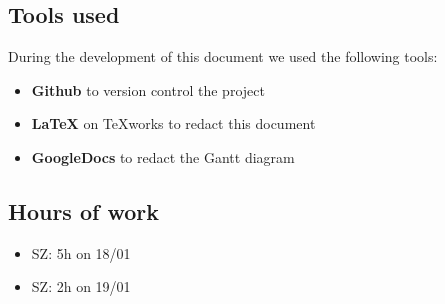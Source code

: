 \documentclass[11pt]{article} %
\begin{document}
\subsection{Tools used}
During the development of this document we used the following tools:
\begin{itemize}
	\item \textbf{Github} to version control the project
	\item \textbf{\LaTeX} on TeXworks to redact this document
	\item \textbf{GoogleDocs} to redact the Gantt diagram
\end{itemize}

\subsection{Hours of work}
\begin{itemize}
	\item SZ: 5h on 18/01
	\item SZ: 2h on 19/01
\end{itemize}
\end{document}

